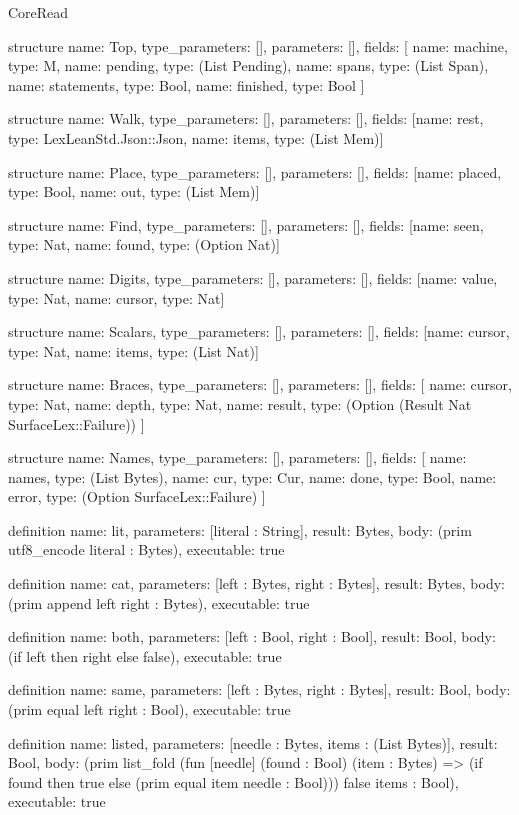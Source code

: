 \begin{lexlean}{CoreRead}
\begin{semanticmodule}
structure{
  name: Top,
  type_parameters: [],
  parameters: [],
  fields: [
    {name: machine, type: M},
    {name: pending, type: (List Pending)},
    {name: spans, type: (List Span)},
    {name: statements, type: Bool},
    {name: finished, type: Bool}
  ]
}

structure{
  name: Walk,
  type_parameters: [],
  parameters: [],
  fields: [{name: rest, type: LexLeanStd.Json::Json}, {name: items, type: (List Mem)}]
}

structure{
  name: Place,
  type_parameters: [],
  parameters: [],
  fields: [{name: placed, type: Bool}, {name: out, type: (List Mem)}]
}

structure{
  name: Find,
  type_parameters: [],
  parameters: [],
  fields: [{name: seen, type: Nat}, {name: found, type: (Option Nat)}]
}

structure{
  name: Digits,
  type_parameters: [],
  parameters: [],
  fields: [{name: value, type: Nat}, {name: cursor, type: Nat}]
}

structure{
  name: Scalars,
  type_parameters: [],
  parameters: [],
  fields: [{name: cursor, type: Nat}, {name: items, type: (List Nat)}]
}

structure{
  name: Braces,
  type_parameters: [],
  parameters: [],
  fields: [
    {name: cursor, type: Nat},
    {name: depth, type: Nat},
    {name: result, type: (Option (Result Nat SurfaceLex::Failure))}
  ]
}

structure{
  name: Names,
  type_parameters: [],
  parameters: [],
  fields: [
    {name: names, type: (List Bytes)},
    {name: cur, type: Cur},
    {name: done, type: Bool},
    {name: error, type: (Option SurfaceLex::Failure)}
  ]
}

definition{
  name: lit,
  parameters: [literal : String],
  result: Bytes,
  body: (prim utf8_encode literal : Bytes),
  executable: true
}

definition{
  name: cat,
  parameters: [left : Bytes, right : Bytes],
  result: Bytes,
  body: (prim append left right : Bytes),
  executable: true
}

definition{
  name: both,
  parameters: [left : Bool, right : Bool],
  result: Bool,
  body: (if left then right else false),
  executable: true
}

definition{
  name: same,
  parameters: [left : Bytes, right : Bytes],
  result: Bool,
  body: (prim equal left right : Bool),
  executable: true
}

definition{
  name: listed,
  parameters: [needle : Bytes, items : (List Bytes)],
  result: Bool,
  body: (prim list_fold (fun [needle] (found : Bool) (item : Bytes) => (if found then true else (prim equal item needle : Bool))) false items : Bool),
  executable: true
}


\end{semanticmodule}
\end{lexlean}
